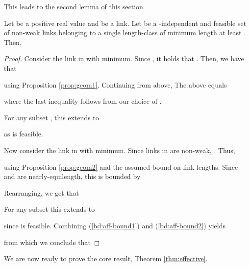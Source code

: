 \documentclass[11pt]{amsart}
\begin{document}
This leads to the second lemma of this section.
\begin{lemma}
Let  be a positive real value and  be a link.
Let  be a -independent and feasible set of
non-weak links belonging to a single length-class of minimum length at least
.
Then, 

\label{lem:affequi}
\end{lemma}
\begin{proof}
Consider the link  in  with  minimum.
Since , it holds that .
Then, we have that

using Proposition \ref{prop:geom1}. Continuing from above,
The above equals

where the last inequality follows from our choice of .

For any subset , this extends to 

as  is feasible.

Now consider the link  in  with  minimum. 
Since links in  are non-weak, .
Thus,

using Proposition \ref{prop:geom2} and the assumed bound on link lengths.
 Since  and  are nearly-equilength, this is bounded by

Rearranging, we get that

For any subset  this extends to 

since  is feasible. 
Combining (\ref{bd:aff-bound1}) and (\ref{bd:aff-bound2}) yields

from which we conclude that 

\end{proof}








We are now ready to prove the core result, Theorem \ref{thm:effective}.

\smallskip
\end{document}
